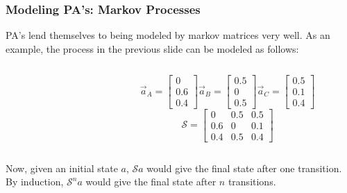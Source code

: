 \documentclass{beamer}
\begin{document}
\begin{frame}[fragile]
\frametitle{Modeling PA's: Markov Processes}

PA's lend themselves to being modeled by markov matrices very well. As an example,
the process in the previous slide can be modeled as follows:

\pause 
\begin{center}
\begin{columns}[onlytextwidth]
\begin{column}{0.3\textwidth}
\end{column}
\begin{column}{0.7\textwidth}
$$
\vec{a}_A = \begin{bmatrix} 0 \\ 0.6 \\ 0.4 \end{bmatrix}
\vec{a}_B = \begin{bmatrix} 0.5 \\ 0 \\ 0.5 \end{bmatrix}
\vec{a}_C = \begin{bmatrix} 0.5 \\ 0.1 \\ 0.4 \end{bmatrix}$$
$$
\mathcal{S} = \begin{bmatrix}
0 & 0.5 & 0.5 \\
0.6 & 0 & 0.1 \\
0.4 & 0.5 & 0.4
\end{bmatrix}
$$
\end{column}
\end{columns}
\end{center}
\pause
Now, given an initial state $a$, $\mathcal{S}a$ would give the final state after
one transition. By induction, $\mathcal{S}^n a$ would give the final state after
$n$ transitions.
\end{frame}
\end{document}

